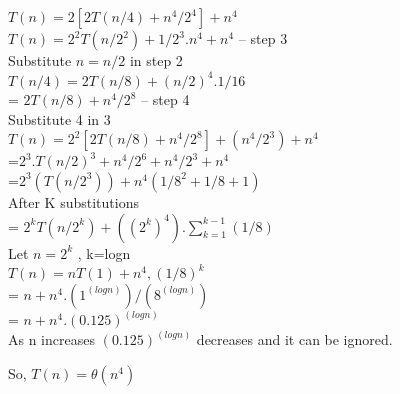 \documentclass[11pt]{article}
\begin{document}
\begin{enumerate}
$T(n)=2[2T(n/4)+n^4/2^4] + n^4$ \\
$T(n) = 2^2 T(n/2^2) + 1/2^3.n^4+n^4$ -- step 3\\
Substitute  $n=n/2$ in step 2 \\
$T(n/4) = 2T(n/8)+(n/2)^4. 1/16$ \\
        = $2T(n/8) + n^4/2^8$  -- step 4\\

Substitute 4 in 3 \\

$T(n) = 2^2[2T(n/8) + n^4/2^8]+(n^4/2^3)+n^4$ \\
      =$2^3.T(n/2)^3+n^4/2^6+n^4/2^3+n^4 $\\
      =$2^3(T(n/2^3))+n^4(1/8^2 + 1/8 +1)$ \\

After K substitutions \\ 

=  $2^kT(n/2^k)+ ((2^k)^4).\sum_{k=1}^{k-1}(1/8)$ \\

Let $n = 2^k$ , k=logn \\

$T(n) = nT(1)+n^4,(1/8)^k$ \\
      = $n+n^4.(1^(log n))/(8^(log n))$ \\
      = $n+n^4.(0.125)^(log n)$ \\

As n increases $(0.125)^(log n)$ decreases and it can be ignored.

So, $T(n) = \theta(n^4)$











\end{enumerate}
\end{document}
